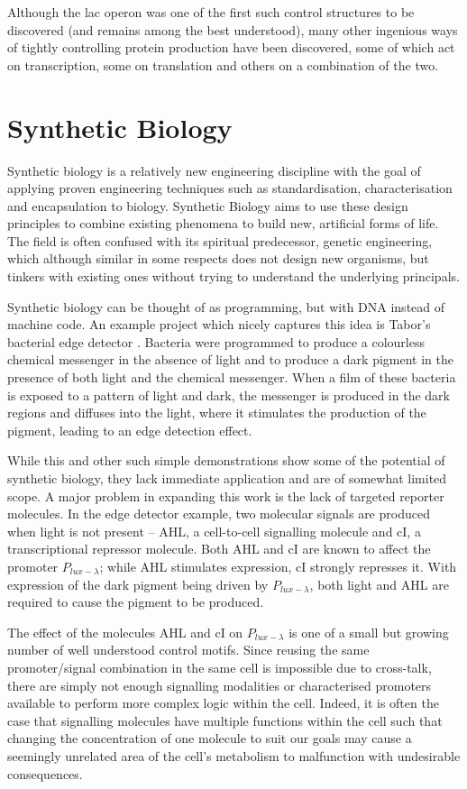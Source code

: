 Although the lac operon was one of the first such control structures to be
discovered (and remains among the best understood), many other ingenious ways
of tightly controlling protein production have been discovered, some of which
act on transcription, some on translation and others on a combination of the
two.

\section{Synthetic Biology}
\label{sec:synbio}

Synthetic biology is a relatively new
engineering discipline with the goal of applying proven engineering techniques
such as standardisation, characterisation and encapsulation to biology.
Synthetic Biology aims to use these design principles to combine existing 
phenomena to build new, artificial forms of life.
The field is often confused with its spiritual predecessor, genetic 
engineering, which although similar in some respects does not design new
organisms, but tinkers with existing ones without trying to understand the
underlying principals.

Synthetic biology can be thought of as programming, but with DNA instead of 
machine code.
An example project which nicely captures this idea is Tabor's bacterial edge
detector \citep{edgeDetector}.
Bacteria were programmed to produce a colourless chemical messenger in the 
absence of light and to produce a dark pigment in the presence of both light 
and the chemical messenger.
When a film of these bacteria is exposed to a pattern of light and dark, the
messenger is produced in the dark regions and diffuses into the light, where it
stimulates the production of the pigment, 
leading to an edge detection effect.

While this and other such simple demonstrations show some of the potential 
of synthetic biology, they lack immediate application and are of somewhat 
limited scope.
A major problem in expanding this work is the lack of targeted reporter
molecules.
In the edge detector example, two molecular signals are produced when light is 
not present -- AHL, a cell-to-cell signalling molecule and cI, a
transcriptional repressor molecule.
Both AHL and cI are known to affect the promoter $P_{lux-\lambda}$; while AHL 
stimulates expression, cI strongly represses it.
With expression of the dark pigment being driven by $P_{lux-\lambda}$, 
both light and AHL are required to cause the pigment to be produced.

The effect of the molecules AHL and cI on $P_{lux-\lambda}$ is one of a small
but growing number of well understood control motifs.
Since reusing the same promoter/signal combination in the same cell is 
impossible due to cross-talk, there are simply not enough signalling modalities 
or characterised promoters available to perform more complex logic within the 
cell.
Indeed, it is often the case that signalling molecules have multiple functions
within the cell such that changing the concentration of one molecule to suit
our goals may cause a seemingly unrelated area of the cell's metabolism to
malfunction with undesirable consequences.

